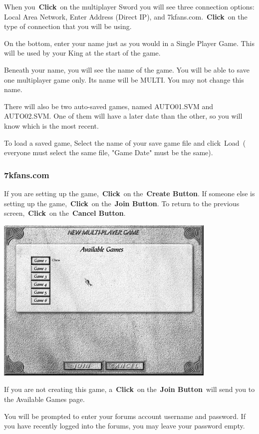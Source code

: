 When you \textbf{Click} on the multiplayer Sword you will see three connection options: Local Area Network, Enter Address (Direct IP), and 7kfans.com. \textbf{Click} on the type of connection that you will be using.

On the bottom, enter your name just as you would in a Single Player Game. This will be used by your King at the start of the game.

Beneath your name, you will see the name of the game. You will be able to save one multiplayer game only. Its name will be MULTI. You may not change this name.

There will also be two auto-saved games, named AUTO01.SVM and AUTO02.SVM. One of them will have a later date than the other, so you will know which is the most recent.

To load a saved game, Select the name of your save game file and click Load ( everyone must select the same file, "Game Date" must be the same).

\subsubsection{7kfans.com}

If you are setting up the game, \textbf{Click} on the \textbf{Create Button}. If someone else is setting up the game, \textbf{Click} on the \textbf{Join Button}. To return to the previous screen, \textbf{Click} on the \textbf{Cancel Button}.

\begin{center}
	\includegraphics[width=0.7\linewidth]{Imultiplayer2}
\end{center}

If you are not creating this game, a \textbf{Click} on the \textbf{Join Button} will send you to the Available Games page.

You will be prompted to enter your forums account username and password. If you have recently logged into the forums, you may leave your password empty.


